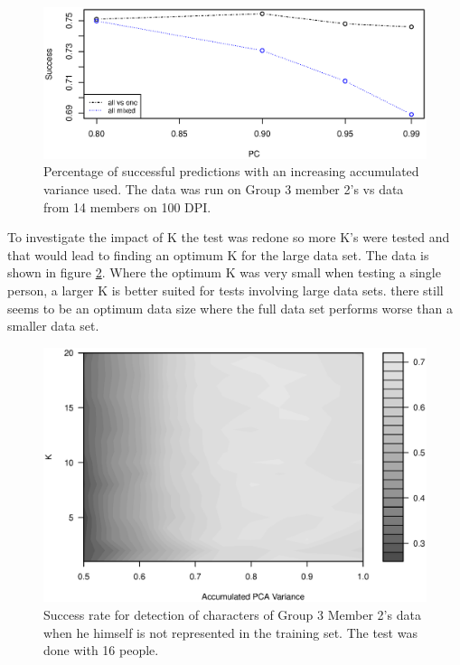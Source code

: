 \begin{figure}[h]
\centering
\includegraphics[width =0.8 \textwidth]{graphics/pca_success}
\caption[PCA performance]{Percentage of successful predictions with an increasing accumulated variance used.
The data was run on Group 3 member 2's vs data from 14 members on 100 DPI. }
\label{fig:pca_success}
\end{figure}

To investigate the impact of K the test was redone so more K's were tested and that would lead to finding an optimum K for the large data set.
The data is shown in figure \ref{fig:k_v_PCA}. 
Where the optimum K was very small when testing a single person, a larger K is better suited for tests involving large data sets.
there still seems to be an optimum data size where the full data set performs worse than a smaller data set. 

\begin{figure}[h]
\centering
\includegraphics[width = \textwidth]{graphics/contour_k_PCA_oneVsRest}
\caption[Detailed PCA performance]{Success rate for detection of characters of Group 3 Member 2's data when he himself is not represented in the training set. 
The test was done with 16 people.}
\label{fig:k_v_PCA}
\end{figure}


